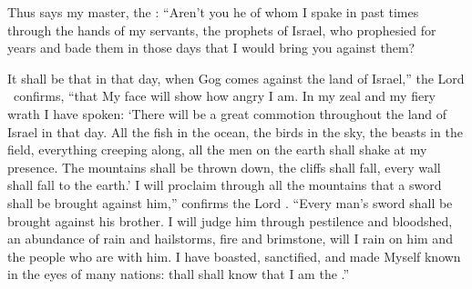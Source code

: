 
\begin{inparaenum}



   Thus says my master, the \lord: ``Aren't you he of whom I spake in past times through the hands of my servants, the prophets of Israel, who prophesied for years and bade them in those days that I would bring you against them?%

   It shall be that in that day, when Gog comes against the land of Israel,'' the Lord \god\ confirms, ``that My face will show how angry I am.%
   In my zeal and my fiery wrath I have spoken: `There will be a great commotion throughout the land of Israel in that day.%
   All the fish in the ocean, the birds in the sky, the beasts in the field, everything creeping along, all the men on the earth shall shake at my presence. The mountains shall be thrown down, the cliffs shall fall, every wall shall fall to the earth.'%
   I will proclaim through all the mountains that a sword shall be brought against him,'' confirms the Lord \god. ``Every man's sword shall be brought against his brother.%
   I will judge him through pestilence and bloodshed, an abundance of rain and hailstorms, fire and brimstone, will I rain on him and the people who are with him.%
   I have boasted, sanctified, and made Myself known in the eyes of many nations: thall shall know that I am the \lord.''%
\end{inparaenum}

